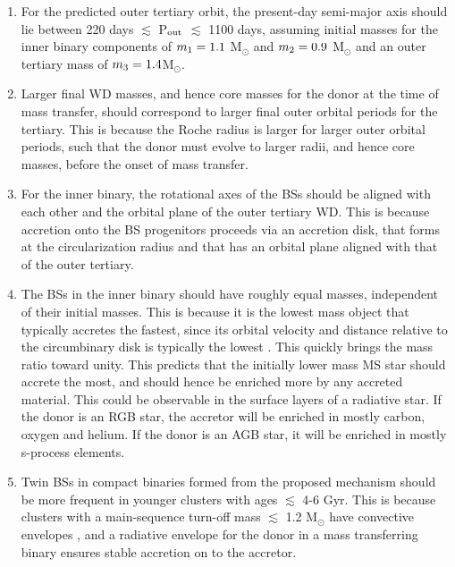 \documentclass{aastex62}
\begin{document}
\begin{enumerate}

\item For the predicted outer tertiary orbit, the present-day semi-major axis should lie between 220 days $\lesssim$ P$_{\rm out}$ $\lesssim$ 1100 days, assuming initial masses for the inner binary components of $m_{\rm 1} = 1.1$ M$_{\odot}$ and $m_{\rm 2} = 0.9$ M$_{\odot}$ and an outer tertiary mass of $m_{\rm 3} = 1.4 $M$_{\odot}$.

\item Larger final WD masses, and hence core masses for the donor at the time of mass transfer, should correspond to larger final outer orbital periods for the tertiary.  This is because the Roche radius is larger for larger outer orbital periods, such that the donor must evolve to larger radii, and hence core masses, before the onset of mass transfer.

\item For the inner binary, the rotational axes of the BSs should be aligned with each other and the orbital plane of the outer tertiary WD.  This is because accretion onto the BS progenitors proceeds via an accretion disk, that forms at the circularization radius and that has an orbital plane aligned with that of the outer tertiary.

\item The BSs in the inner binary should have roughly equal masses,
  independent of their initial masses.  This is because it is the
  lowest mass object that typically accretes the fastest, since its
  orbital velocity and distance relative to the circumbinary disk is
  typically the lowest
  \citep[e.g.][]{kroupa95,bate97,bate00,haiman09,bate12,farris15,rafikov16,kelley17}.
  This quickly brings the mass ratio toward unity.  This predicts that
  the initially lower mass MS star should accrete the most, and should
  hence be enriched more by any accreted material.  This could be
  observable in the surface layers of a radiative star.  If the donor
  is an RGB star, the accretor will be enriched in mostly carbon,
  oxygen and helium.  If the donor is an AGB star, it will be enriched
  in mostly s-process elements.

\item Twin BSs in compact binaries formed from the proposed mechanism should be more frequent in younger clusters with ages $\lesssim$ 4-6 Gyr.  This is because clusters with a main-sequence turn-off mass $\lesssim$ 1.2 M$_{\odot}$ have convective envelopes \citep[e.g.][]{iben91,maedoer09}, and a radiative envelope for the donor in a mass transferring binary ensures stable accretion on to the accretor.

\end{enumerate}
\end{document}
